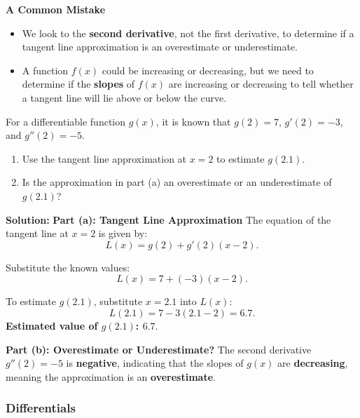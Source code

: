 \documentclass[12pt]{article}
\theoremstyle{beautifulthm}
\begin{document}
\begin{Note}{\textbf{A Common Mistake}}{}
\begin{itemize}
    \item We look to the \textbf{second derivative}, not the first derivative, to determine if a tangent line approximation is an overestimate or underestimate.
    \item A function \( f(x) \) could be increasing or decreasing, but we need to determine if the \textbf{slopes} of \( f(x) \) are increasing or decreasing to tell whether a tangent line will lie above or below the curve.
\end{itemize}
\end{Note}



\begin{tcolorbox}[colback=examplebg, colframe=red!75!black, title=\textbf{EXAMPLE 3: Tangent Line Approximation}, fonttitle=\bfseries, sharp corners]
For a differentiable function \( g(x) \), it is known that \( g(2) = 7 \), \( g'(2) = -3 \), and \( g''(2) = -5 \).

\begin{enumerate}
    \item[(a)] Use the tangent line approximation at \( x = 2 \) to estimate \( g(2.1) \).
    \item[(b)] Is the approximation in part (a) an overestimate or an underestimate of \( g(2.1) \)? 
\end{enumerate}
\tcblower
\textbf{Solution:} 
\textbf{Part (a): Tangent Line Approximation}
The equation of the tangent line at \( x = 2 \) is given by:
\[
L(x) = g(2) + g'(2)(x - 2).
\]

Substitute the known values:
\[
L(x) = 7 + (-3)(x - 2).
\]

To estimate \( g(2.1) \), substitute \( x = 2.1 \) into \( L(x) \):
\[
L(2.1) = 7 - 3(2.1 - 2)=6.7.
\]
\textbf{Estimated value of \( g(2.1) \): \( 6.7 \)}.

\textbf{Part (b): Overestimate or Underestimate?}
The second derivative \( g''(2) = -5 \) is \textbf{negative}, indicating that the slopes of \( g(x) \) are \textbf{decreasing}, meaning the approximation is an \textbf{overestimate}.




\end{tcolorbox}

\newpage
\subsubsection{Differentials}
\end{document}
